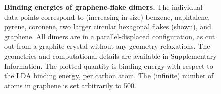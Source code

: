 \begin{figure}
\caption{\textbf{Binding energies of graphene-flake dimers.}
The individual data points correspond to (increasing in size) benzene, naphtalene, pyrene, coronene, two larger circular hexagonal flakes (shown), and graphene.
All dimers are in a parallel-displaced configuration, as cut out from a graphite crystal without any geometry relaxations.
The geometries and computational details are available in Supplementary Information.
The plotted quantity is binding energy with respect to the LDA binding energy, per carbon atom.
The (infinite) number of atoms in graphene is set arbitrarily to 500.
}\label{fig:flakes}
\end{figure}

